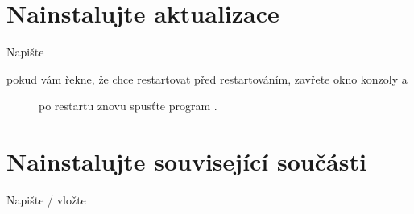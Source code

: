 \documentclass[letterpaper,10pt,czech]{sphinxmanual}
\begin{document}
\section{Nainstalujte aktualizace}
\label{\detokenize{build-win32:nainstalujte-aktualizace}}
Napište

\begin{sphinxVerbatim}[commandchars=\\\{\}]
 
\end{sphinxVerbatim}
\begin{description}
\item[{pokud vám řekne, že chce restartovat před restartováním, zavřete okno konzoly a}] \leavevmode
po restartu znovu spusťte program .

\end{description}


\section{Nainstalujte související součásti}
\label{\detokenize{build-win32:nainstalujte-souvisejici-soucasti}}
Napište / vložte

\begin{sphinxVerbatim}[commandchars=\\\{\}]
     \PYGZbs{}
  \PYGZbs{}
  \PYGZbs{}
   \PYGZbs{}
  \PYGZbs{}
 
\end{sphinxVerbatim}
\end{document}
